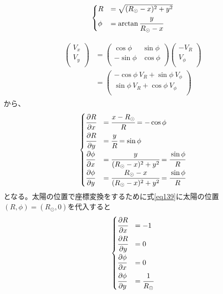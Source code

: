 \begin{align}
\begin{cases}
	R &= \sqrt{(R_{\odot}-x)^2 + y^2 }\\
	\phi &= \arctan{\cfrac{y}{R_{\odot}-x}}
\end{cases}
\end{align}

\begin{align}
\begin{aligned}
	\left(
	\begin{array}{c}
	 	V_x\\
		V_y\\
	\end{array}
	\right)
	&=
	\left(
	\begin{array}{cc}
	 	\cos{\phi} & \sin{\phi}\\
		-\sin{\phi} & \cos{\phi}\\
	\end{array}
	\right)
	\left(
	\begin{array}{c}
	 	-V_R\\
		V_{\phi}\\
	\end{array}
	\right) \\
	&=
	\left(
	\begin{array}{c}
	 	-\cos{\phi}\ V_R + \sin{\phi}\ V_{\phi}\\
		\sin{\phi}\ V_R + \cos{\phi}\ V_{\phi}\\
	\end{array}
	\right)
\end{aligned}
\end{align}
から、
\begin{align}
\begin{cases}
	\cfrac{\partial R}{\partial x} &= \cfrac{x-R_{\odot}}{R} = -\cos{\phi} \\[2mm]
	\cfrac{\partial R}{\partial y} &= \cfrac{y}{R} = \sin{\phi} \\[2mm]
	\cfrac{\partial \phi}{\partial x} &= \cfrac{y}{(R_{\odot}-x)^2 + y^2} = \cfrac{\sin{\phi}}{R} \\[2mm]
	\cfrac{\partial \phi}{\partial y} &= \cfrac{R_{\odot}-x}{(R_{\odot}-x)^2 + y^2} = \cfrac{\sin{\phi}}{R}
\end{cases} \label{eq139}
\end{align}
となる。太陽の位置で座標変換をするために式\ref{eq139}に太陽の位置$(R,\phi)=(R_{\odot},0)$を代入すると
\begin{align}
\begin{cases}
	\cfrac{\partial R}{\partial x} &= -1 \\[2mm]
	\cfrac{\partial R}{\partial y} &= 0 \\[2mm]
	\cfrac{\partial \phi}{\partial x} &= 0 \\[2mm]
	\cfrac{\partial \phi}{\partial y} &= \cfrac{1}{R_{\odot}}
\end{cases} \label{eq161}
\end{align}
